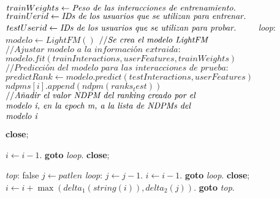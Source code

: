 \begin{algorithm}
\begin{algorithmic}[1]
    \\
    \State $trainWeights \gets \parbox[t]{8cm}{\raggedright \textit{Peso de las interacciones de entrenamiento. }}\nonumber$
    \\
    \State $trainUerid \gets \parbox[t]{8cm}{\raggedright \textit{IDs de los usuarios que se utilizan para entrenar. }}\nonumber$
    \State $testUserid \gets \parbox[t]{8cm}{\raggedright \textit{IDs de los usuarios que se utilizan para probar. }}\nonumber$
    \BState \emph{loop}:
        \State $modelo \gets LightFM()$ $\parbox[t]{8cm}{//\raggedright \textit{Se crea el modelo LightFM }}\nonumber$
        \\
        \State$\textit{//Ajustar modelo a la información extraida:}$
        \State $modelo.fit(trainInteractions,userFeatures ,trainWeights)$ 
        \\
        \State$\textit{//Predicción del modelo para las interacciones de prueba:}$
        \State $predictRank \gets modelo.predict(testInteractions, userFeatures)$
        \\
        \State $ndpms[i].append(ndpm(ranks_test))$ $\parbox[t]{8cm}{//\raggedright \textit{Añadir el valor NDPM del ranking creado por el modelo i, en la epoch m, a la lista de NDPMs del modelo i}}\nonumber$


        \State \textbf{close};
    \EndFor
    
    \State $i \gets i-1$.
    \State \textbf{goto} \emph{loop}.
    \State \textbf{close};
\EndFor
\EndProcedure
{}
\end{algorithmic}
\end{algorithm}
\begin{algorithm}
\begin{algorithmic}[1]
\BState \emph{top}:
 \Return false
\EndIf
\State $j \gets \textit{patlen}$
\BState \emph{loop}:
\State $j \gets j-1$.
\State $i \gets i-1$.
\State \textbf{goto} \emph{loop}.
\State \textbf{close};
\EndIf
\State $i \gets i+\max(\textit{delta}_1(\textit{string}(i)),\textit{delta}_2(j))$.
\State \textbf{goto} \emph{top}.
\end{algorithmic}
\end{algorithm}
